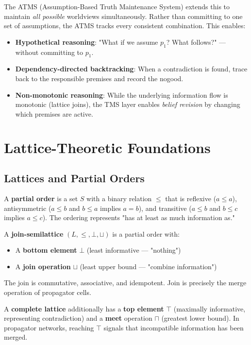 \documentclass[11pt]{article}
\begin{document}
The ATMS (Assumption-Based Truth Maintenance System) extends this to
maintain \emph{all possible} worldviews simultaneously. Rather than committing
to one set of assumptions, the ATMS tracks every consistent combination.
This enables:

\begin{itemize}
\item \textbf{Hypothetical reasoning}: "What if we assume \(p_1\)? What follows?"
--- without committing to \(p_1\).
\item \textbf{Dependency-directed backtracking}: When a contradiction is found,
trace back to the responsible premises and record the nogood.
\item \textbf{Non-monotonic reasoning}: While the underlying information flow is
monotonic (lattice joins), the TMS layer enables \emph{belief revision} by
changing which premises are active.
\end{itemize}
\section{Lattice-Theoretic Foundations}
\label{sec:org063aa5a}

\subsection{Lattices and Partial Orders}
\label{sec:org288f4b7}

A \textbf{partial order} is a set \(S\) with a binary relation \(\leq\) that is
reflexive (\(a \leq a\)), antisymmetric (\(a \leq b\) and \(b \leq a\)
implies \(a = b\)), and transitive (\(a \leq b\) and \(b \leq c\) implies \(a
\leq c\)). The ordering represents "has at least as much information as."

A \textbf{join-semilattice} \((L, \leq, \bot, \sqcup)\) is a partial order with:

\begin{itemize}
\item A \textbf{bottom element} \(\bot\) (least informative --- "nothing")
\item A \textbf{join operation} \(\sqcup\) (least upper bound --- "combine
information")
\end{itemize}

The join is commutative, associative, and idempotent. Join is precisely
the merge operation of propagator cells.

A \textbf{complete lattice} additionally has a \textbf{top element} \(\top\) (maximally
informative, representing contradiction) and a \textbf{meet} operation \(\sqcap\)
(greatest lower bound). In propagator networks, reaching \(\top\) signals
that incompatible information has been merged.
\end{document}
